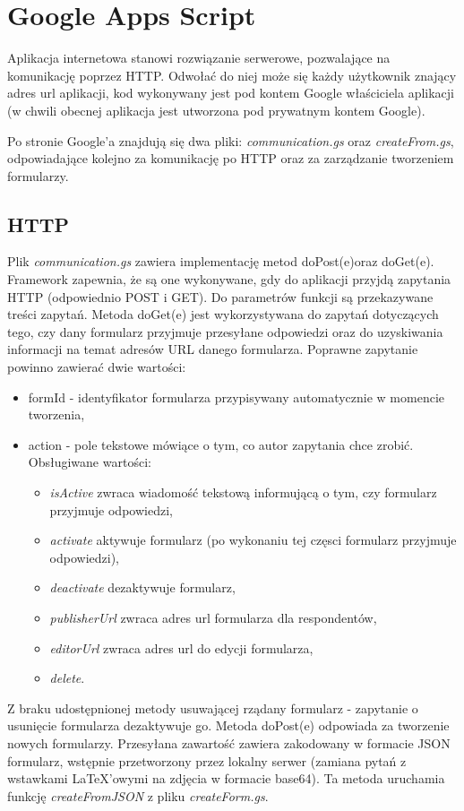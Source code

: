 \section{Google Apps Script}
Aplikacja internetowa stanowi rozwiązanie serwerowe, pozwalające na komunikację poprzez HTTP. Odwołać do niej może się każdy użytkownik znający adres url aplikacji, kod wykonywany jest pod kontem Google właściciela aplikacji (w chwili obecnej aplikacja jest utworzona pod prywatnym kontem Google).

\ind Po stronie Google'a znajdują się dwa pliki: \textit{communication.gs} oraz \textit{createFrom.gs}, odpowiadające kolejno za komunikację po HTTP oraz za zarządzanie tworzeniem formularzy. 
\subsection{HTTP}
Plik \textit{communication.gs} zawiera implementację metod doPost(e)oraz doGet(e). Framework zapewnia, że są one wykonywane, gdy do aplikacji przyjdą zapytania HTTP (odpowiednio POST i GET). Do parametrów funkcji są przekazywane treści zapytań.
\ind Metoda doGet(e) jest wykorzystywana do zapytań dotyczących tego, czy dany formularz przyjmuje przesyłane odpowiedzi oraz do uzyskiwania informacji na temat adresów URL danego formularza.  Poprawne zapytanie powinno zawierać dwie wartości:
\begin{itemize}
\item formId - identyfikator formularza przypisywany automatycznie w momencie tworzenia,
\item action - pole tekstowe mówiące o tym, co autor zapytania chce zrobić. Obsługiwane wartości:
\begin{itemize}e
\item \textit{isActive} zwraca wiadomość tekstową informującą o tym, czy formularz przyjmuje odpowiedzi,
\item \textit{activate} aktywuje formularz (po wykonaniu tej częsci formularz przyjmuje odpowiedzi),
\item \textit{deactivate} dezaktywuje formularz,
\item \textit{publisherUrl} zwraca adres url formularza dla respondentów,
\item \textit{editorUrl} zwraca adres url do edycji formularza,
\item \textit{delete}.
\end{itemize}
\end{itemize}
Z braku udostępnionej metody usuwającej rządany formularz - zapytanie o usunięcie formularza dezaktywuje go. 
\ind Metoda doPost(e) odpowiada  za tworzenie nowych formularzy. Przesyłana zawartość zawiera zakodowany w formacie JSON formularz, wstępnie przetworzony przez lokalny serwer (zamiana pytań z wstawkami \LaTeX{}'owymi na zdjęcia w formacie base64). Ta metoda uruchamia funkcję \textit{createFromJSON} z pliku \textit{createForm.gs}.

